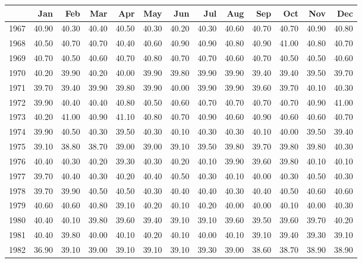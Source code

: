 \begin{longtable}{rrrrrrrrrrrrr}
  \hline
 & Jan & Feb & Mar & Apr & May & Jun & Jul & Aug & Sep & Oct & Nov & Dec \\ 
  \hline
1967 & 40.90 & 40.30 & 40.40 & 40.50 & 40.30 & 40.20 & 40.30 & 40.60 & 40.70 & 40.70 & 40.90 & 40.80 \\ 
  1968 & 40.50 & 40.70 & 40.70 & 40.40 & 40.60 & 40.90 & 40.90 & 40.80 & 40.90 & 41.00 & 40.80 & 40.70 \\ 
  1969 & 40.70 & 40.50 & 40.60 & 40.70 & 40.80 & 40.70 & 40.70 & 40.60 & 40.70 & 40.50 & 40.50 & 40.60 \\ 
  1970 & 40.20 & 39.90 & 40.20 & 40.00 & 39.90 & 39.80 & 39.90 & 39.90 & 39.40 & 39.40 & 39.50 & 39.70 \\ 
  1971 & 39.70 & 39.40 & 39.90 & 39.80 & 39.90 & 40.00 & 39.90 & 39.90 & 39.60 & 39.70 & 40.10 & 40.30 \\ 
  1972 & 39.90 & 40.40 & 40.40 & 40.80 & 40.50 & 40.60 & 40.70 & 40.70 & 40.70 & 40.70 & 40.90 & 41.00 \\ 
  1973 & 40.20 & 41.00 & 40.90 & 41.10 & 40.80 & 40.70 & 40.90 & 40.60 & 40.90 & 40.60 & 40.60 & 40.70 \\ 
  1974 & 39.90 & 40.50 & 40.30 & 39.50 & 40.30 & 40.10 & 40.30 & 40.30 & 40.10 & 40.00 & 39.50 & 39.40 \\ 
  1975 & 39.10 & 38.80 & 38.70 & 39.00 & 39.00 & 39.10 & 39.50 & 39.80 & 39.70 & 39.80 & 39.80 & 40.30 \\ 
  1976 & 40.40 & 40.30 & 40.20 & 39.30 & 40.30 & 40.20 & 40.10 & 39.90 & 39.60 & 39.80 & 40.10 & 40.10 \\ 
  1977 & 39.70 & 40.40 & 40.30 & 40.20 & 40.40 & 40.50 & 40.30 & 40.10 & 40.00 & 40.30 & 40.50 & 40.30 \\ 
  1978 & 39.70 & 39.90 & 40.50 & 40.50 & 40.30 & 40.40 & 40.40 & 40.30 & 40.40 & 40.50 & 40.60 & 40.60 \\ 
  1979 & 40.60 & 40.60 & 40.80 & 39.10 & 40.20 & 40.10 & 40.20 & 40.00 & 40.00 & 40.10 & 40.00 & 40.30 \\ 
  1980 & 40.40 & 40.10 & 39.80 & 39.60 & 39.40 & 39.10 & 39.10 & 39.60 & 39.50 & 39.60 & 39.70 & 40.20 \\ 
  1981 & 40.40 & 39.80 & 40.00 & 40.10 & 40.20 & 40.10 & 40.00 & 40.10 & 39.10 & 39.40 & 39.30 & 39.10 \\ 
  1982 & 36.90 & 39.10 & 39.00 & 39.10 & 39.10 & 39.10 & 39.30 & 39.00 & 38.60 & 38.70 & 38.90 & 38.90 \\ 

\end{longtable}
